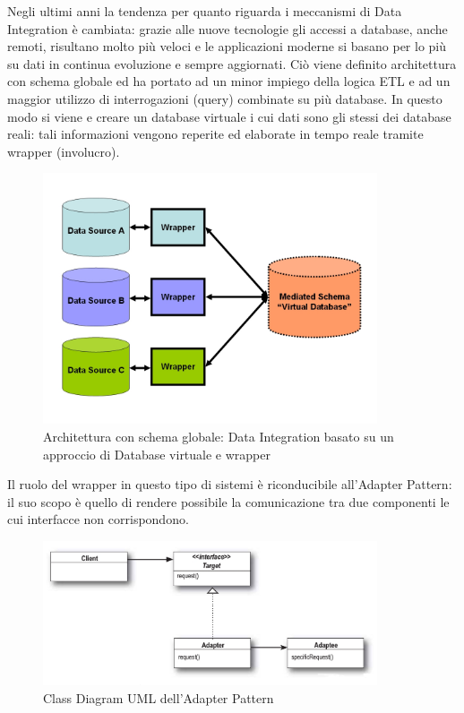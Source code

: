 \documentclass[12pt]{report}
\begin{document}
\vspace{5mm} %

Negli ultimi anni la tendenza per quanto riguarda i meccanismi di Data Integration è cambiata: grazie alle nuove tecnologie gli accessi a database, anche remoti, risultano molto più veloci e le applicazioni moderne si basano per lo più su dati in continua evoluzione e sempre aggiornati.
Ciò viene definito architettura con schema globale ed ha portato ad un minor impiego della logica ETL e ad un maggior utilizzo di interrogazioni (query) combinate su più database.
In questo modo si viene e creare un database virtuale i cui dati sono gli stessi dei database reali: tali informazioni vengono reperite ed elaborate in tempo reale tramite wrapper (involucro).

\begin{figure}[H]
    \centering
    \includegraphics[width=280pt]{Dataintegration+Wrapper.jpg}
    \caption{Architettura con schema globale: Data Integration basato su un approccio di Database virtuale e wrapper}
    \label{fig:Data_Integration_Wrapper}
\end{figure}

\newpage

Il ruolo del wrapper in questo tipo di sistemi è riconducibile all'Adapter Pattern: il suo scopo è quello di rendere possibile la comunicazione tra due componenti le cui interfacce non corrispondono.

\begin{figure}[H]
    \centering
    \includegraphics[width=280pt]{Adapter.jpg}
    \caption{Class Diagram UML dell'Adapter Pattern}
    \label{fig:Adapter_Pattern}
\end{figure}
\end{document}
